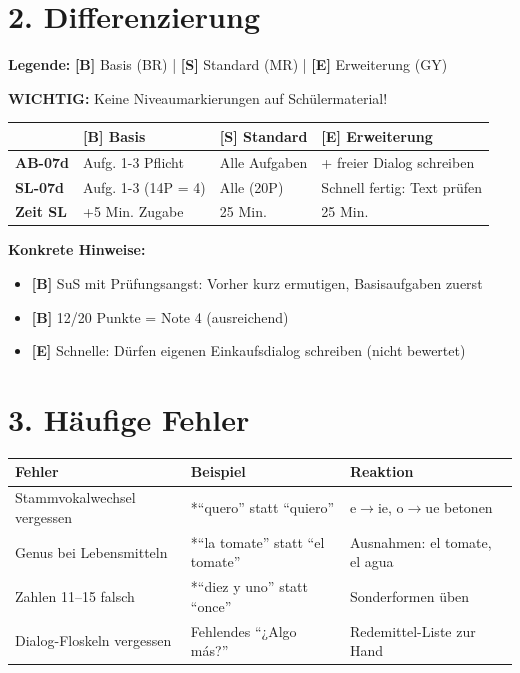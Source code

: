\documentclass[11pt, a4paper]{article}
\newcommand{\B}{\textcolor{basis}{\textbf{[B]}}}
\newcommand{\Std}{\textcolor{standard}{\textbf{[S]}}}
\newcommand{\E}{\textcolor{erweiterung}{\textbf{[E]}}}
\begin{document}
\section*{2. Differenzierung}

\begin{differenzierung}
\textbf{Legende:} \B{} Basis (BR) | \Std{} Standard (MR) | \E{} Erweiterung (GY)

\textbf{WICHTIG:} Keine Niveaumarkierungen auf Schülermaterial!
\end{differenzierung}

\vspace{1em}

\begin{tabularx}{\textwidth}{|l|X|X|X|}
\hline
& \B{} \textbf{Basis} & \Std{} \textbf{Standard} & \E{} \textbf{Erweiterung} \\
\hline
\textbf{AB-07d} & Aufg. 1-3 Pflicht & Alle Aufgaben & + freier Dialog schreiben \\
\hline
\textbf{SL-07d} & Aufg. 1-3 (14P = 4) & Alle (20P) & Schnell fertig: Text prüfen \\
\hline
\textbf{Zeit SL} & +5 Min. Zugabe & 25 Min. & 25 Min. \\
\hline
\end{tabularx}

\vspace{1em}

\textbf{Konkrete Hinweise:}
\begin{itemize}
    \item \B{} SuS mit Prüfungsangst: Vorher kurz ermutigen, Basisaufgaben zuerst
    \item \B{} 12/20 Punkte = Note 4 (ausreichend)
    \item \E{} Schnelle: Dürfen eigenen Einkaufsdialog schreiben (nicht bewertet)
\end{itemize}

\section*{3. Häufige Fehler}

\begin{fehlerbox}
\begin{tabularx}{\textwidth}{|l|X|X|}
\hline
\textbf{Fehler} & \textbf{Beispiel} & \textbf{Reaktion} \\
\hline
Stammvokalwechsel vergessen & *``quero'' statt ``quiero'' & e$\rightarrow$ie, o$\rightarrow$ue betonen \\
\hline
Genus bei Lebensmitteln & *``la tomate'' statt ``el tomate'' & Ausnahmen: el tomate, el agua \\
\hline
Zahlen 11--15 falsch & *``diez y uno'' statt ``once'' & Sonderformen üben \\
\hline
Dialog-Floskeln vergessen & Fehlendes ``¿Algo más?'' & Redemittel-Liste zur Hand \\
\hline
\end{tabularx}
\end{fehlerbox}
\end{document}
